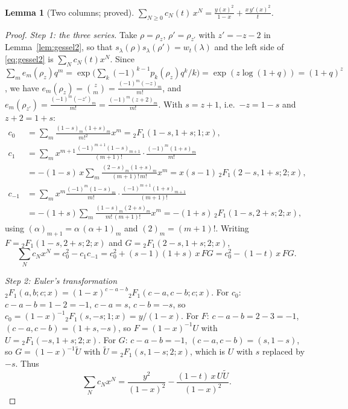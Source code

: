 \documentclass[11pt]{article}
\newtheorem{lemma}[theorem]{Lemma}
\theoremstyle{definition}
\theoremstyle{remark}
\newcommand{\F}[4]{{}_2F_1\!\left(#1,#2;#3;#4\right)}
\begin{document}
\begin{lemma}[Two columns; proved]\label{lem:twocol}
$\displaystyle\sum_{N\ge0}c_N(t)\,x^N=\frac{y(x)^2}{1-x}+\frac{x\,y'(x)^2}{t}$.
\end{lemma}

\begin{proof}
\emph{Step 1: the three series.} Take $\rho=\rho_z$, $\rho'=\rho_{z'}$ with $z'=-z-2$ in Lemma~\ref{lem:gessel2}, so that $s_\lambda(\rho)s_\lambda(\rho')=w_t(\lambda)$ and the left side of \eqref{eq:gessel2} is $\sum_Nc_N(t)x^N$. Since $\sum_me_m(\rho_z)q^m=\exp\bigl(\sum_k(-1)^{k-1}p_k(\rho_z)q^k/k\bigr)=\exp(z\log(1+q))=(1+q)^z$, we have $e_m(\rho_z)=\binom zm=\frac{(-1)^m(-z)_m}{m!}$, and $e_m(\rho_{z'})=\frac{(-1)^m(-z')_m}{m!}=\frac{(-1)^m(z+2)_m}{m!}$. With $s=z+1$, i.e.\ $-z=1-s$ and $z+2=1+s$:
\begin{align*}
c_0&=\sum_m\frac{(1-s)_m(1+s)_m}{m!^2}x^m=\F{1-s}{1+s}{1}{x},\\
c_1&=\sum_m x^{m+1}\frac{(-1)^{m+1}(1-s)_{m+1}}{(m+1)!}\cdot\frac{(-1)^m(1+s)_m}{m!}\\
&=-(1-s)\,x\sum_m\frac{(2-s)_m(1+s)_m}{(m+1)!\,m!}x^m=x(s-1)\,\F{2-s}{1+s}{2}{x},\\
c_{-1}&=\sum_m x^{m}\frac{(-1)^m(1-s)_m}{m!}\cdot\frac{(-1)^{m+1}(1+s)_{m+1}}{(m+1)!}\\
&=-(1+s)\sum_m\frac{(1-s)_m(2+s)_m}{m!\,(m+1)!}x^m=-(1+s)\,\F{1-s}{2+s}{2}{x},
\end{align*}
using $(\alpha)_{m+1}=\alpha\,(\alpha+1)_m$ and $(2)_m=(m+1)!$. Writing $F=\F{1-s}{2+s}{2}{x}$ and $G=\F{2-s}{1+s}{2}{x}$,
\[
\sum_Nc_Nx^N=c_0^2-c_1c_{-1}=c_0^2+(s-1)(1+s)\,x\,FG=c_0^2-(1-t)\,x\,FG .
\]

\emph{Step 2: Euler's transformation} $\F abcx=(1-x)^{c-a-b}\F{c-a}{c-b}cx$. For $c_0$: $c-a-b=1-2=-1$, $c-a=s$, $c-b=-s$, so $c_0=(1-x)^{-1}\F s{-s}1x=y/(1-x)$. For $F$: $c-a-b=2-3=-1$, $(c-a,c-b)=(1+s,-s)$, so $F=(1-x)^{-1}U$ with $U=\F{-s}{1+s}{2}{x}$. For $G$: $c-a-b=-1$, $(c-a,c-b)=(s,1-s)$, so $G=(1-x)^{-1}\tilde U$ with $\tilde U=\F{s}{1-s}{2}{x}$, which is $U$ with $s$ replaced by $-s$. Thus
\begin{equation}\label{eq:T1}
\sum_Nc_Nx^N=\frac{y^2}{(1-x)^2}-\frac{(1-t)\,x\,U\tilde U}{(1-x)^2}.
\end{equation}


\end{proof}
\end{document}
